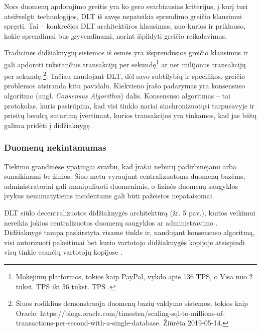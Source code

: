Nors duomenų apdorojimo greitis yra ko gero svarbiausias kriterijus, į kurį turi atsižvelgti technologijos, DLT iš savęs nepateikia sprendimo greičio klausimui spręsti. Tai – konkrečios DLT architektūros klausimas, nuo kurios ir priklauso, kokie sprendimai bus įgyvendinami, norint išpildyti greičio reikalavimus.

Tradicinės didžiaknygių sistemos iš esmės yra išsprendusios greičio klausimus ir gali apdoroti tūkstančius transakcijų per sekundę\footnote{Mokėjimų platformos, tokios kaip PayPal, vykdo apie 136 TPS, o Visa nuo 2 tūkst. TPS iki 56 tūkst. TPS \cite{herrera2016privacy}.} ar net milijonus transakcijų per sekundę \footnote{Šiuos rodiklius demonstruoja duomenų bazių valdymo sistemos, tokios kaip Oracle: https://blogs.oracle.com/timesten/scaling-sql-to-millions-of-transactions-per-second-with-a-single-database. Žiūrėta 2019-05-14.}. Tačiau naudojant DLT, dėl savo subtilybių ir specifikos, greičio problemos atsiranda kitu pavidalu. Kiekvieno įrašo padarymas yra konsensuso algoritmo (angl. \textit{Consensus Algorithm}) dalis. Konsensuso algoritmas – tai protokolas, kuris pasirūpina, kad visi tinklo nariai sinchronizuotųsi tarpusavyje ir prieitų bendrą sutarimą įvertinant, kurios transakcijos yra tinkamos, kad jas būtų galima pridėti į didžiaknygę \cite{cachin2017blockchain}. 




\subsubsection{Duomenų nekintamumas}

Tiekimo grandinėse ypatingai svarbu, kad įrašai nebūtų padirbinėjami arba sunaikinami be žinios. Šiuo metu vyraujant centralizuotoms duomenų bazėms, administratoriai gali manipuliuoti duomenimis, o fizinės duomenų saugyklos įvykus nenumatytiems incidentams gali būti pažeistos nepataisomai.

DLT siūlo decentralizuotos didžiaknygės architektūrą (žr. 5 pav.), kurios veikimui nereikia jokios centralizuotos duomenų saugyklos ar administravimo \cite{yu2018virtualization}. Didžiaknygė tampa paskirstyta visame tinkle ir, naudojant konsensuso algoritmą, visi autorizuoti pakeitimai bet kurio vartotojo didžiaknygės kopijoje atsispindi visų tinkle esančių vartotojų kopijose \cite{puthal2018blockchain}. 


